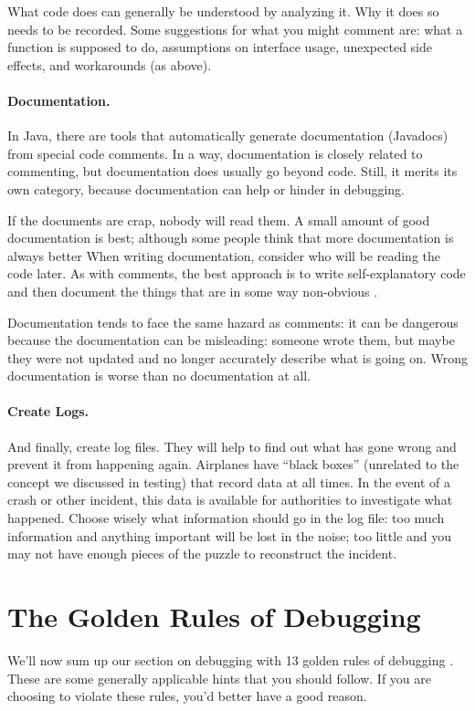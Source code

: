 What code does can generally be understood by analyzing it. Why it does so needs to be recorded. Some suggestions for what you might comment are: what a function is supposed to do, assumptions on interface usage, unexpected side effects, and workarounds (as above).

\paragraph{Documentation.} In Java, there are tools that automatically generate documentation (Javadocs) from special code comments. In a way, documentation is closely related to commenting, but documentation does usually go beyond code. Still, it merits its own category, because documentation can help or hinder in debugging.

If the documents are crap, nobody will read them. A small amount of good documentation is best; although some people think that more documentation is always better When writing documentation, consider who will be reading the code later. As with comments, the best approach is to write self-explanatory code and then document the things that are in some way non-obvious \cite{howToProgrammer}.

Documentation tends to face the same hazard as comments: it can be dangerous because the documentation can be misleading: someone wrote them, but maybe they were not updated and no longer accurately describe what is going on. Wrong documentation is worse than no documentation at all.

\paragraph{Create Logs.}
And finally, create log files. They will help to find out what has gone wrong and prevent it from happening again. Airplanes have ``black boxes'' (unrelated to the concept we discussed in testing) that record data at all times. In the event of a crash or other incident, this data is available for authorities to investigate what happened. Choose wisely what information should go in the log file: too much information and anything important will be lost in the noise; too little and you may not have enough pieces of the puzzle to reconstruct the incident.


\section*{The Golden Rules of Debugging}
We'll now sum up our section on debugging with 13 golden rules of debugging \cite{dgtd}. These are some generally applicable hints that you should follow. If you are choosing to violate these rules, you'd better have a good reason.

